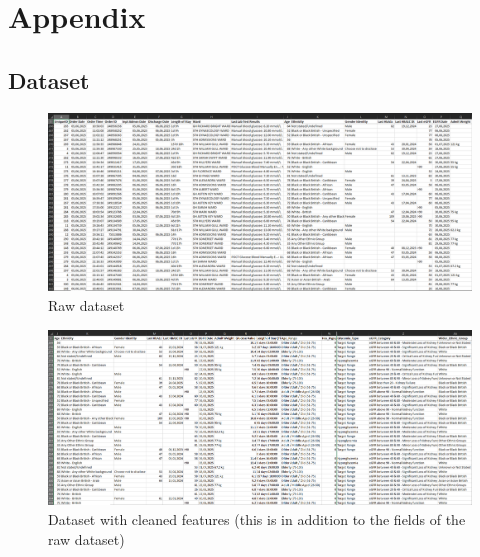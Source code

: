 \section{Appendix}

\subsection{Dataset} \label{app:Dataset}

	\begin{figure}[H]
		\centering
		\includegraphics[width=9in, angle=90]{figures/dataset_screenshot_xl.png}
		\caption{Raw dataset}
		\label{fig:rawDataset}
	\end{figure}

	\begin{figure}[H]
		\centering
		\includegraphics[width=9.5in, angle=90]{figures/cleaned_dataset_screenshot_xl.png}
		\caption{Dataset with cleaned features (this is in addition to the fields of the raw dataset)}
		\label{fig:cleanedDataset}
	\end{figure}




